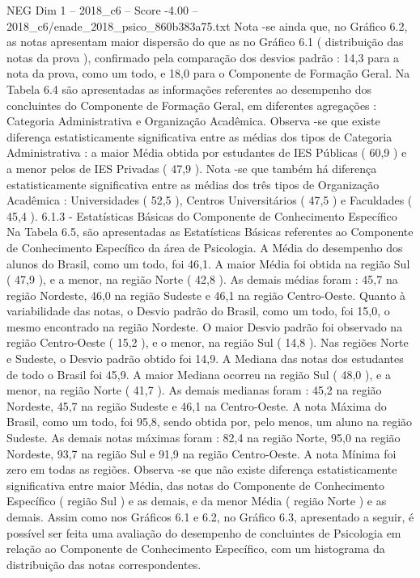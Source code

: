 \begin{textsample}{NEG Dim 1 – 2018\_c6 – Score -4.00 – 2018\_c6/enade\_2018\_psico\_860b383a75.txt}
Nota -se ainda que, no Gráfico 6.2, as notas apresentam maior dispersão do que as no Gráfico 6.1 ( distribuição das notas da prova ), confirmado pela comparação dos desvios padrão : 14,3 para a nota da prova, como um todo, e 18,0 para o Componente de Formação Geral.
Na Tabela 6.4 são apresentadas as informações referentes ao desempenho dos concluintes do Componente de Formação Geral, em diferentes agregações : Categoria Administrativa e Organização Acadêmica.
Observa -se que existe diferença estatisticamente significativa entre as médias dos tipos de Categoria Administrativa : a maior Média obtida por estudantes de IES Públicas ( 60,9 ) e a menor pelos de IES Privadas ( 47,9 ).
Nota -se que também há diferença estatisticamente significativa entre as médias dos três tipos de Organização Acadêmica : Universidades ( 52,5 ), Centros Universitários ( 47,5 ) e Faculdades ( 45,4 ). 6.1.3 - Estatísticas Básicas do Componente de Conhecimento Específico Na Tabela 6.5, são apresentadas as Estatísticas Básicas referentes ao Componente de Conhecimento Específico da área de Psicologia.
A Média do desempenho dos alunos do Brasil, como um todo, foi 46,1.
A maior Média foi obtida na região Sul ( 47,9 ), e a menor, na região Norte ( 42,8 ).
As demais médias foram : 45,7 na região Nordeste, 46,0 na região Sudeste e 46,1 na região Centro-Oeste.
Quanto à variabilidade das notas, o Desvio padrão do Brasil, como um todo, foi 15,0, o mesmo encontrado na região Nordeste.
O maior Desvio padrão foi observado na região Centro-Oeste ( 15,2 ), e o menor, na região Sul ( 14,8 ).
Nas regiões Norte e Sudeste, o Desvio padrão obtido foi 14,9.
A Mediana das notas dos estudantes de todo o Brasil foi 45,9.
A maior Mediana ocorreu na região Sul ( 48,0 ), e a menor, na região Norte ( 41,7 ).
As demais medianas foram : 45,2 na região Nordeste, 45,7 na região Sudeste e 46,1 na Centro-Oeste.
A nota Máxima do Brasil, como um todo, foi 95,8, sendo obtida por, pelo menos, um aluno na região Sudeste.
As demais notas máximas foram : 82,4 na região Norte, 95,0 na região Nordeste, 93,7 na região Sul e 91,9 na região Centro-Oeste.
A nota Mínima foi zero em todas as regiões.
Observa -se que não existe diferença estatisticamente significativa entre maior Média, das notas do Componente de Conhecimento Específico ( região Sul ) e as demais, e da menor Média ( região Norte ) e as demais.
Assim como nos Gráficos 6.1 e 6.2, no Gráfico 6.3, apresentado a seguir, é possível ser feita uma avaliação do desempenho de concluintes de Psicologia em relação ao Componente de Conhecimento Específico, com um histograma da distribuição das notas correspondentes.

\end{textsample}

